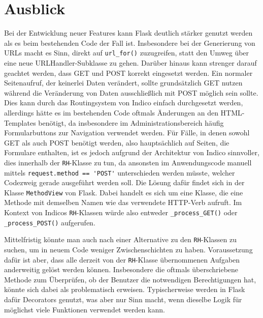 \section{Ausblick}

Bei der Entwicklung neuer Features kann Flask deutlich stärker genutzt werden als es beim
bestehenden Code der Fall ist. Insbesondere bei der Generierung von URLs macht es Sinn, direkt auf
\lstinline{url_for()} zuzugreifen, statt den Umweg über eine neue URLHandler-Subklasse zu gehen.
Darüber hinaus kann strenger darauf geachtet werden, dass GET und POST korrekt eingesetzt werden.
Ein normaler Seitenaufruf, der keinerlei Daten verändert, sollte grundsätzlich GET nutzen während
die Veränderung von Daten ausschließlich mit POST möglich sein sollte. Dies kann durch das
Routingsystem von Indico einfach durchgesetzt werden, allerdings hätte es im bestehenden Code
oftmals Änderungen an den HTML-Templates benötigt, da insbesondere im Administrationsbereich häufig
Formularbuttons zur Navigation verwendet werden. Für Fälle, in denen sowohl GET als auch POST
benötigt werden, also hauptsächlich auf Seiten, die Formulare enthalten, ist es jedoch aufgrund
der Architektur von Indico sinnvoller, dies innerhalb der \lstinline{RH}-Klasse zu tun, da ansonsten
im Anwendungscode manuell mittels \lstinline{request.method == 'POST'} unterschieden werden müsste,
welcher Codezweig gerade ausgeführt werden soll. Die Lösung dafür findet sich in der Klasse
\lstinline{MethodView} von Flask. Dabei handelt es sich um eine Klasse, die eine Methode mit
demselben Namen wie das verwendete HTTP-Verb aufruft. Im Kontext von Indicos \lstinline{RH}-Klassen
würde also entweder \lstinline{_process_GET()} oder \lstinline{_process_POST()} aufgerufen.

Mittelfristig könnte man auch nach einer Alternative zu den \lstinline{RH}-Klassen zu suchen, um in
neuem Code weniger Zwischenschichten zu haben. Voraussetzung dafür ist aber, dass alle derzeit von
der \lstinline{RH}-Klasse übernommenen Aufgaben anderweitig gelöst werden können. Insbesondere die
oftmals überschriebene Methode zum Überprüfen, ob der Benutzer die notwendigen Berechtigungen hat,
könnte sich dabei als problematisch erweisen. Typischerweise werden in Flask dafür Decorators
genutzt, was aber nur Sinn macht, wenn dieselbe Logik für möglichst viele Funktionen verwendet
werden kann.
